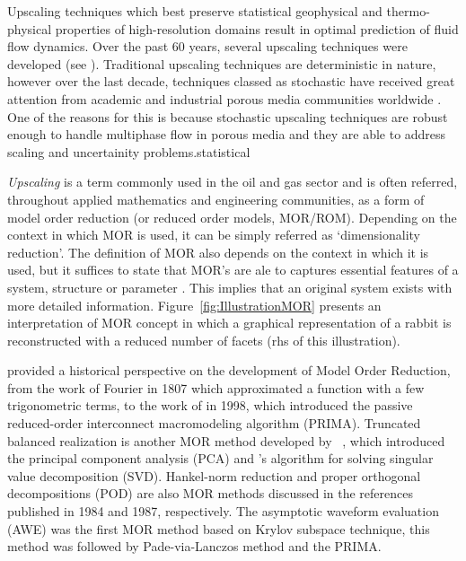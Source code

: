 \documentclass[preprint,12pt]{elsarticle}
\begin{document}
Upscaling techniques which best preserve statistical geophysical and thermo-physical properties of high-resolution domains result in optimal prediction of fluid flow dynamics. Over the past 60 years, several upscaling techniques were developed (see \cite{Hasting_2001, Renard_1997, Szymkiewicz_2013}). Traditional upscaling techniques are deterministic in nature, however over the last decade, techniques classed as stochastic have received great attention from academic and industrial porous media communities worldwide \cite{Guilleminot_2012, Ravalec-Dupin_2010, Verwoerd_2009}. One of the reasons for this is because stochastic upscaling techniques are robust enough to handle multiphase flow in porous media and they are able to address scaling and uncertainity problems.statistical

\medskip
{\it Upscaling} is a term commonly used in the oil and gas sector and is often referred, throughout applied mathematics and engineering communities, as a form of model order reduction (or reduced order models, MOR/ROM). Depending on the context in which MOR is used, it can be simply referred as `dimensionality reduction'. The definition of MOR also depends on the context in which it is used, but it suffices to state that MOR's are ale to captures essential features of a system, structure or parameter \cite{Schilders2008}. This implies that an original system exists with more detailed information. Figure~\ref{fig:IllustrationMOR} presents an interpretation of MOR concept in which a graphical representation of a rabbit is reconstructed with a reduced number of facets (rhs of this illustration).  

\citet{Schilders2008} provided a historical perspective on the development of Model Order Reduction, from the work of Fourier in 1807 which approximated a function with a few trigonometric terms, to the work of \citet{Odabasioglu_1998} in 1998, which introduced the passive reduced-order interconnect macromodeling algorithm (PRIMA). Truncated balanced realization is another MOR method developed by \citeauthor{Moore_1981}~\cite{Moore_1981}, which introduced the principal component analysis (PCA) \cite{Hotelling_1933} and \citeauthor{Golub1970}'s \cite{Golub1970} algorithm for solving singular value decomposition (SVD). Hankel-norm reduction \cite{Glover_1984} and proper orthogonal decompositions (POD) \cite{Sirovich_1987} are also MOR methods discussed in the references published in 1984 and 1987, respectively. The asymptotic waveform evaluation (AWE) \cite{Pillage_1990} was the first MOR method based on Krylov subspace technique, this method was followed by Pade-via-Lanczos method \cite{Feldmann_1995} and the PRIMA.
\end{document}
